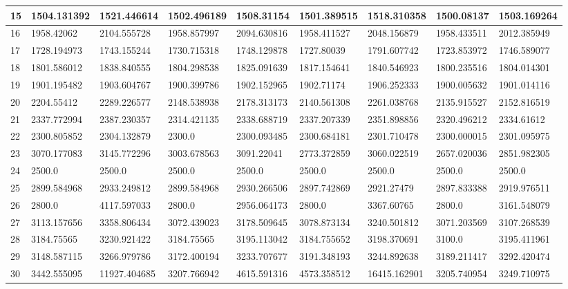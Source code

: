 \begin{table}
\begin{tabular}{|p{0.8cm}|p{1.6cm}|p{1.6cm}|p{1.6cm}|p{1.6cm}|p{1.6cm}|p{1.6cm}|p{1.6cm}|p{1.6cm}|}
 \hline
15  & 1504.131392 & 1521.446614 & 1502.496189 & 1508.31154 & 1501.389515 & 1518.310358 & 1500.08137 & 1503.169264 \\ 
 \hline
16  & 1958.42062 & 2104.555728 & 1958.857997 & 2094.630816 & 1958.411527 & 2048.156879 & 1958.433511 & 2012.385949 \\ 
 \hline
17  & 1728.194973 & 1743.155244 & 1730.715318 & 1748.129878 & 1727.80039 & 1791.607742 & 1723.853972 & 1746.589077 \\ 
 \hline
18  & 1801.586012 & 1838.840555 & 1804.298538 & 1825.091639 & 1817.154641 & 1840.546923 & 1800.235516 & 1804.014301 \\ 
 \hline
19  & 1901.195482 & 1903.604767 & 1900.399786 & 1902.152965 & 1902.71174 & 1906.252333 & 1900.005632 & 1901.014116 \\ 
 \hline
20  & 2204.55412 & 2289.226577 & 2148.538938 & 2178.313173 & 2140.561308 & 2261.038768 & 2135.915527 & 2152.816519 \\ 
 \hline
21  & 2337.772994 & 2387.230357 & 2314.421135 & 2338.688719 & 2337.207339 & 2351.898856 & 2320.496212 & 2334.61612 \\ 
 \hline
22  & 2300.805852 & 2304.132879 & 2300.0 & 2300.093485 & 2300.684181 & 2301.710478 & 2300.000015 & 2301.095975 \\ 
 \hline
23  & 3070.177083 & 3145.772296 & 3003.678563 & 3091.22041 & 2773.372859 & 3060.022519 & 2657.020036 & 2851.982305 \\ 
 \hline
24  & 2500.0 & 2500.0 & 2500.0 & 2500.0 & 2500.0 & 2500.0 & 2500.0 & 2500.0 \\ 
 \hline
25  & 2899.584968 & 2933.249812 & 2899.584968 & 2930.266506 & 2897.742869 & 2921.27479 & 2897.833388 & 2919.976511 \\ 
 \hline
26  & 2800.0 & 4117.597033 & 2800.0 & 2956.064173 & 2800.0 & 3367.60765 & 2800.0 & 3161.548079 \\ 
 \hline
27  & 3113.157656 & 3358.806434 & 3072.439023 & 3178.509645 & 3078.873134 & 3240.501812 & 3071.203569 & 3107.268539 \\ 
 \hline
28  & 3184.75565 & 3230.921422 & 3184.75565 & 3195.113042 & 3184.755652 & 3198.370691 & 3100.0 & 3195.411961 \\ 
 \hline
29  & 3148.587115 & 3266.979786 & 3172.400194 & 3233.707677 & 3191.348193 & 3244.892638 & 3189.211417 & 3292.420474 \\ 
 \hline
30  & 3442.555095 & 11927.404685 & 3207.766942 & 4615.591316 & 4573.358512 & 16415.162901 & 3205.740954 & 3249.710975 \\
 \hline

 \end{tabular}
\end{table}




